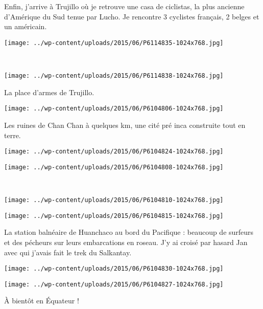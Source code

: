 Enfin, j'arrive à Trujillo où je retrouve une casa de ciclistas, la plus ancienne d'Amérique du Sud tenue par Lucho. Je rencontre 3 cyclistes français, 2 belges et un américain. 
\begin{center} \texttt{[image: ../wp-content/uploads/2015/06/P6114835-1024x768.jpg]} \end{center}
\vspace{-\topsep}
\pagebreak
~
\vspace{-4mm}
\begin{center} \texttt{[image: ../wp-content/uploads/2015/06/P6114838-1024x768.jpg]} \end{center}

La place d'armes de Trujillo. 
\begin{center} \texttt{[image: ../wp-content/uploads/2015/06/P6104806-1024x768.jpg]} \end{center}
\vspace{-\topsep}
\pagebreak
Les ruines de Chan Chan à quelques km, une cité pré inca construite tout en terre. 
\begin{center} \texttt{[image: ../wp-content/uploads/2015/06/P6104824-1024x768.jpg]} \end{center}
\begin{center} \texttt{[image: ../wp-content/uploads/2015/06/P6104808-1024x768.jpg]} \end{center}
\vspace{-\topsep}
\vspace{-2.75mm}
\pagebreak
~\\
\begin{center} \texttt{[image: ../wp-content/uploads/2015/06/P6104810-1024x768.jpg]} \end{center}
\begin{center} \texttt{[image: ../wp-content/uploads/2015/06/P6104815-1024x768.jpg]} \end{center}
\vspace{-\topsep}
\vspace{-2.75mm}
\pagebreak
La station balnéaire de Huanchaco au bord du Pacifique : beaucoup de surfeurs et des pécheurs sur leurs embarcations en roseau. J'y ai croisé par hasard Jan avec qui j'avais fait le trek du Salkantay. 
\begin{center} \texttt{[image: ../wp-content/uploads/2015/06/P6104830-1024x768.jpg]} \end{center}
\begin{center} \texttt{[image: ../wp-content/uploads/2015/06/P6104827-1024x768.jpg]} \end{center}

\`A bientôt en Équateur !